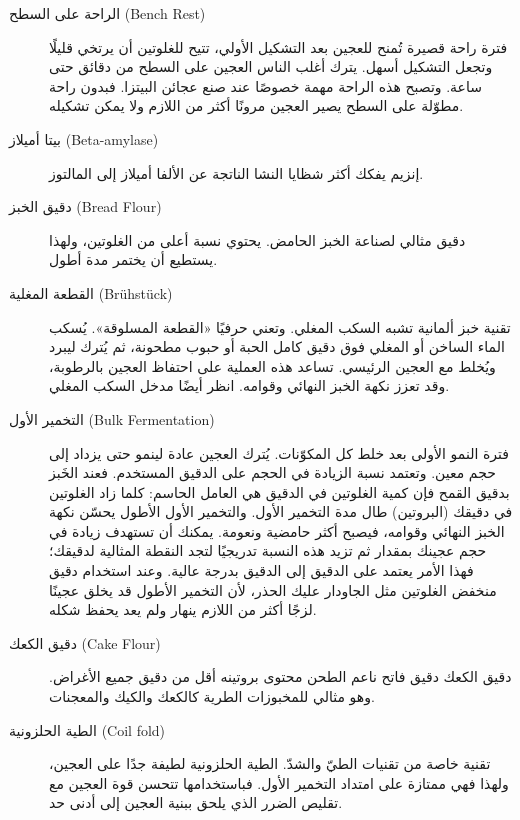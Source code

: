 \begin{description}
\item[الراحة على السطح \textenglish{(Bench Rest)}]
فترة راحة قصيرة تُمنح للعجين بعد التشكيل الأولي، تتيح للغلوتين أن يرتخي قليلًا وتجعل التشكيل أسهل. يترك أغلب الناس العجين على السطح من  دقائق حتى ساعة. وتصبح هذه الراحة مهمة خصوصًا عند صنع عجائن البيتزا. فبدون راحة مطوّلة على السطح يصير العجين مرونًا أكثر من اللازم ولا يمكن تشكيله.

\item[بيتا أميلاز \textenglish{(Beta-amylase)}]
إنزيم يفكك أكثر شظايا النشا الناتجة عن الألفا أميلاز إلى المالتوز.

\item[دقيق الخبز \textenglish{(Bread Flour)}]
دقيق مثالي لصناعة الخبز الحامض. يحتوي نسبة أعلى من الغلوتين، ولهذا يستطيع أن يختمر مدة أطول.

\item[القطعة المغلية \textenglish{(Brühstück)}]
تقنية خبز ألمانية تشبه السكب المغلي. وتعني حرفيًا «القطعة المسلوقة». يُسكب الماء الساخن أو المغلي فوق دقيق كامل الحبة أو حبوب مطحونة، ثم يُترك ليبرد ويُخلط مع العجين الرئيسي. تساعد هذه العملية على احتفاظ العجين بالرطوبة، وقد تعزز نكهة الخبز النهائي وقوامه. انظر أيضًا مدخل السكب المغلي.

\item[التخمير الأول \textenglish{(Bulk Fermentation)}]
فترة النمو الأولى بعد خلط كل المكوّنات. يُترك العجين عادة لينمو حتى يزداد إلى حجم معين. وتعتمد نسبة الزيادة في الحجم على الدقيق المستخدم. فعند الخَبز بدقيق القمح فإن كمية الغلوتين في الدقيق هي العامل الحاسم: كلما زاد الغلوتين في دقيقك (البروتين) طال مدة التخمير الأول. والتخمير الأول الأطول يحسّن نكهة الخبز النهائي وقوامه، فيصبح أكثر حامضية ونعومة. يمكنك أن تستهدف زيادة في حجم عجينك بمقدار  ثم تزيد هذه النسبة تدريجيًا لتجد النقطة المثالية لدقيقك؛ فهذا الأمر يعتمد على الدقيق إلى الدقيق بدرجة عالية. وعند استخدام دقيق منخفض الغلوتين مثل الجاودار عليك الحذر، لأن التخمير الأطول قد يخلق عجينًا لزجًا أكثر من اللازم ينهار ولم يعد يحفظ شكله.

\item[دقيق الكعك \textenglish{(Cake Flour)}]
دقيق الكعك دقيق فاتح ناعم الطحن محتوى بروتينه أقل من دقيق جميع الأغراض. وهو مثالي للمخبوزات الطرية كالكعك والكيك والمعجنات.

\item[الطية الحلزونية \textenglish{(Coil fold)}]
تقنية خاصة من تقنيات الطيّ والشدّ. الطية الحلزونية لطيفة جدًا على العجين، ولهذا فهي ممتازة على امتداد التخمير الأول. فباستخدامها تتحسن قوة العجين مع تقليص الضرر الذي يلحق ببنية العجين إلى أدنى حد.


\end{description}
